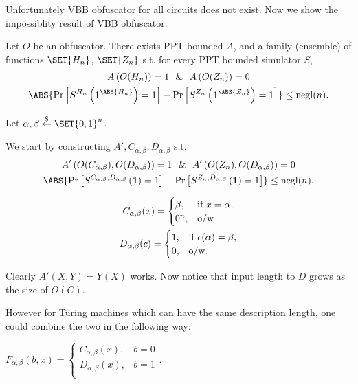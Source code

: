 \documentclass[12pt]{tufte-book}
\begin{document}
Unfortunately VBB obfuscator for all circuits does not exist. Now we show the impossiblity result of VBB obfuscator.
\begin{theorem}
	Let $O$ be an obfuscator.
	There exists PPT bounded $A$, and a family (ensemble) of functions $\SET{H_n}$, $\SET{Z_n}$ s.t.
	for every PPT bounded simulator $S$,
\begin{gather*}
	A\left( O(H_n) \right) = 1 \ \ \& \ \ A\left( O(Z_n) \right) = 0\\
	\ABS{\Pr\left[ S^{H_n} \left( 1^{\ABS{H_n}} \right) = 1 \right] - \Pr \left[ S^{Z_n} \left(1^{\ABS{Z_n}}\right) =1 \right]} \le\mathrm{negl}(n).
\end{gather*}
\end{theorem}

\proof
Let $\alpha, \beta \overset{\$}{\leftarrow} \SET{0,1}^n$.

We start by constructing $A',C_{\alpha,\beta}, D_{\alpha,\beta}$ s.t.
\begin{gather*}
	A'\left( O(C_{\alpha,\beta}), O(D_{\alpha,\beta}) \right) = 1 \ \ \& \ \ A'\left( O(Z_n), O(D_{\alpha,\beta}) \right) = 0\\
	\ABS{\Pr\left[ S^{C_{\alpha,\beta},D_{\alpha,\beta}} \left( \mathbf{1} \right) = 1 \right] - \Pr \left[ S^{Z_n,D_{\alpha,\beta}} \left(\mathbf{1}\right) =1 \right]} \le\mathrm{negl}(n).
\end{gather*}

\begin{gather*}
C_{\alpha,\beta}(x) =
\begin{cases}
	\beta, & \hbox{if } x = \alpha,\\
	0^n, & \hbox{o/w}
\end{cases} \\
D_{\alpha,\beta}(c)=
\begin{cases}
	1,& \hbox{if } c(\alpha) = \beta,\\
	0, & \hbox{o/w}.
\end{cases}
\end{gather*}

Clearly $A'(X,Y) = Y(X)$ works.
Now notice that input length to $D$ grows as the size of $O(C)$.

However for Turing machines which can have the same description length, one could combine the two in the following way:

$F_{\alpha,\beta}(b, x) =
\begin{cases}
	C_{\alpha,\beta}(x), & b=0\\
	D_{\alpha,\beta}(x), & b=1\\
\end{cases}.$
\end{document}
